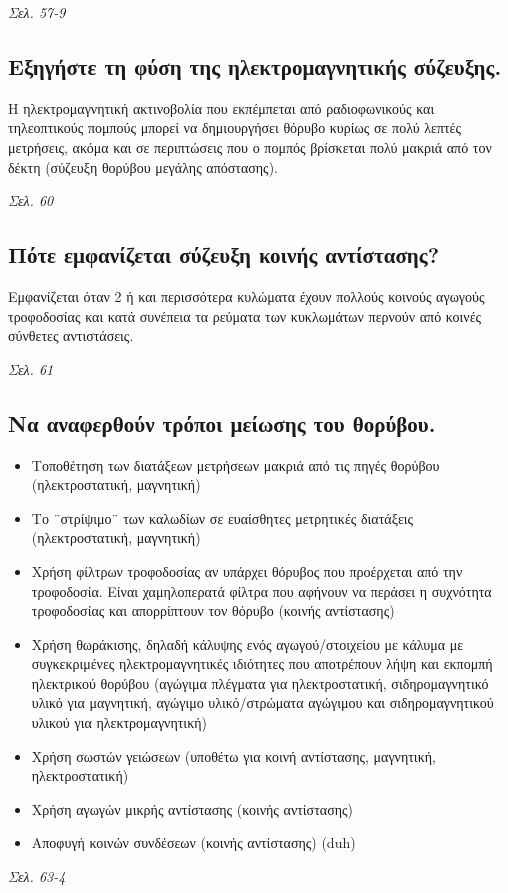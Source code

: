 \documentclass{article}
\begin{document}
\emph{Σελ. 57-9}

\subsection{Εξηγήστε τη φύση της ηλεκτρομαγνητικής σύζευξης.}
Η ηλεκτρομαγνητική ακτινοβολία που εκπέμπεται από ραδιοφωνικούς και τηλεοπτικούς πομπούς μπορεί να δημιουργήσει θόρυβο κυρίως σε πολύ λεπτές μετρήσεις, ακόμα και σε περιπτώσεις που ο πομπός βρίσκεται πολύ μακριά από τον δέκτη (σύζευξη θορύβου μεγάλης απόστασης).

\emph{Σελ. 60}

\subsection{Πότε εμφανίζεται σύζευξη κοινής αντίστασης?}
Εμφανίζεται όταν 2 ή και περισσότερα κυλώματα έχουν πολλούς κοινούς αγωγούς τροφοδοσίας και κατά συνέπεια τα ρεύματα των κυκλωμάτων περνούν από κοινές σύνθετες αντιστάσεις.

\emph{Σελ. 61}

\subsection{Να αναφερθούν τρόποι μείωσης του θορύβου.}
\begin{itemize}
    \item Τοποθέτηση των διατάξεων μετρήσεων μακριά από τις πηγές θορύβου (ηλεκτροστατική, μαγνητική)
    \item Το ¨στρίψιμο¨ των καλωδίων σε ευαίσθητες μετρητικές διατάξεις (ηλεκτροστατική, μαγνητική)
    \item Χρήση φίλτρων τροφοδοσίας αν υπάρχει θόρυβος που προέρχεται από την τροφοδοσία. Είναι χαμηλοπερατά φίλτρα που αφήνουν να περάσει η συχνότητα τροφοδοσίας και απορρίπτουν τον θόρυβο (κοινής αντίστασης)
    \item Χρήση θωράκισης, δηλαδή κάλυψης ενός αγωγού/στοιχείου με κάλυμα με συγκεκριμένες ηλεκτρομαγνητικές ιδιότητες που αποτρέπουν λήψη και εκπομπή ηλεκτρικού θορύβου (αγώγιμα πλέγματα για ηλεκτροστατική, σιδηρομαγνητικό υλικό για μαγνητική, αγώγιμο υλικό/στρώματα αγώγιμου και σιδηρομαγνητικού υλικού για ηλεκτρομαγνητική)
    \item Χρήση σωστών γειώσεων (υποθέτω για κοινή αντίστασης, μαγνητική, ηλεκτροστατική)
    \item Χρήση αγωγών μικρής αντίστασης (κοινής αντίστασης)
    \item Αποφυγή κοινών συνδέσεων (κοινής αντίστασης) \foreignlanguage{english}{(duh)}
\end{itemize}
\emph{Σελ. 63-4}
\end{document}
